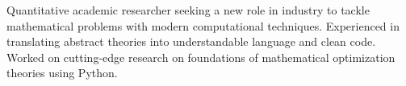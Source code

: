 \documentclass[letter,10pt]{article}
\begin{document}


Quantitative academic researcher seeking a new role in industry to tackle mathematical problems with modern computational techniques. Experienced in translating abstract theories into understandable language and clean code. Worked on cutting-edge research on foundations of mathematical optimization theories using Python. 
\end{document}
